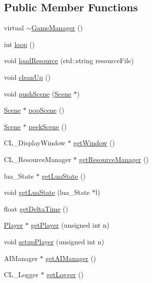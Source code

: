 \subsection*{Public Member Functions}
\begin{DoxyCompactItemize}
\item 
virtual \hyperlink{class_game_manager_aaae63e38e358379c1fe507c5197a8435}{$\sim$GameManager} ()
\item 
int \hyperlink{class_game_manager_a69bf2ea16980b4ea7f7020a7224275d7}{loop} ()
\item 
void \hyperlink{class_game_manager_adefa0357d0e0e1ae80b02923f438404e}{loadResource} (std::string resourceFile)
\item 
void \hyperlink{class_game_manager_a1fbf4d4fe6005ce04d5ce9891dfe9fd7}{cleanUp} ()
\item 
void \hyperlink{class_game_manager_af7e31a2cf58582f655a165d0559e6f54}{pushScene} (\hyperlink{class_scene}{Scene} $\ast$)
\item 
\hyperlink{class_scene}{Scene} $\ast$ \hyperlink{class_game_manager_a87b2553ab3e34b82e6e143bcfb64b8c2}{popScene} ()
\item 
\hyperlink{class_scene}{Scene} $\ast$ \hyperlink{class_game_manager_a2c3d7a054450743f83764181d81a08b4}{peekScene} ()
\item 
CL\_\-DisplayWindow $\ast$ \hyperlink{class_game_manager_aa81d1f4b98f9a3d365ca77a6c787b9a9}{getWindow} ()
\item 
CL\_\-ResourceManager $\ast$ \hyperlink{class_game_manager_a2729794ac0c5ece657ba5f06ea9866ac}{getResourceManager} ()
\item 
lua\_\-State $\ast$ \hyperlink{class_game_manager_aa3dc43fd55a2a8c026e7d0bad7d340f5}{getLuaState} ()
\item 
void \hyperlink{class_game_manager_ae4315c195be165ee5b91dbaae4a93433}{getLuaState} (lua\_\-State $\ast$l)
\item 
float \hyperlink{class_game_manager_a7518f0aa4e8c5d09e8daf1be8131102d}{getDeltaTime} ()
\item 
\hyperlink{class_player}{Player} $\ast$ \hyperlink{class_game_manager_a070533a7d2443a6b7e3e12ee1690c8d8}{getPlayer} (unsigned int n)
\item 
void \hyperlink{class_game_manager_a84cb7228bfaed0b6a5c2f8f0b280daff}{setupPlayer} (unsigned int n)
\item 
AIManager $\ast$ \hyperlink{class_game_manager_a1079d139dd9264e90cf5e7a9d5b92cc3}{getAIManager} ()
\item 
CL\_\-Logger $\ast$ \hyperlink{class_game_manager_a418d779fe3dcef2894477ad597ecca91}{getLogger} ()

\end{DoxyCompactItemize}
